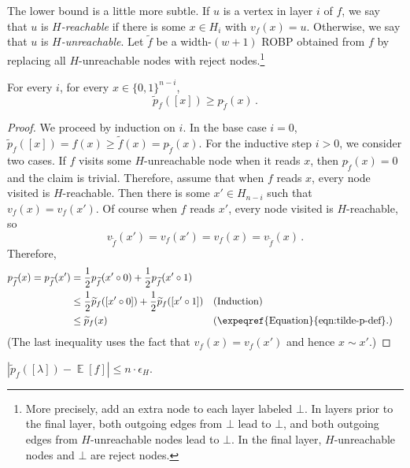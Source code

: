\documentclass{toc}
\DeclareMathOperator*{\ExpVal}{\mathbb{E}}
\begin{document}
The lower bound is a little more subtle. If $u$ is a vertex in layer $i$ of $f$, we say that $u$ is \emph{$H$-reachable} if there is some $x \in H_i$ with $v_f(x) = u$. Otherwise, we say that $u$ is \emph{$H$-unreachable}. Let $\widetilde{f}$ be a width-$(w + 1)$ ROBP obtained from $f$ by replacing all $H$-unreachable nodes with reject nodes.\footnote{More precisely, add an extra node to each layer labeled $\bot$. In layers prior to the final layer, both outgoing edges from $\bot$ lead to $\bot$, and both outgoing edges from $H$-unreachable nodes lead to $\bot$. In the final layer, $H$-unreachable nodes and $\bot$ are reject nodes.}

\begin{claim} \label{clm:const-width-lb}
For every $i$, for every $x \in \{0, 1\}^{n - i}$,
$$
\widetilde{p}_f([x]) \geq p_{\widetilde{f}}(x)\,.
$$
\end{claim}

\begin{proof}
We proceed by induction on $i$. In the base case $i = 0$, $\widetilde{p}_f([x]) = f(x) \geq \widetilde{f}(x) = p_{\widetilde{f}}(x)$. For the inductive step $i > 0$, we consider two cases. If $f$ visits some $H$-unreachable node when it reads $x$, then $p_{\widetilde{f}}(x) = 0$ and the claim is trivial. Therefore, assume that when $f$ reads $x$, every node visited is $H$-reachable. Then there is some $x' \in H_{n - i}$ such that $v_f(x) = v_f(x')$. Of course when $f$ reads $x'$, every node visited is $H$-reachable, so
$$
v_{\widetilde{f}}(x') = v_f(x') = v_f(x) = v_{\widetilde{f}}(x)\,.
$$
Therefore,
\begin{align*}
p_{\widetilde{f}}(x) = p_{\widetilde{f}}(x') &= \frac{1}{2} p_{\widetilde{f}}(x' \circ 0) + \frac{1}{2} p_{\widetilde{f}}(x' \circ 1) \\
&\leq \frac{1}{2} \widetilde{p}_f([x' \circ 0]) + \frac{1}{2} \widetilde{p}_f([x' \circ 1]) && \text{(Induction)} \\
&\leq \widetilde{p}_f(x) && (\text{\expeqref{Equation}{eqn:tilde-p-def}.})
\end{align*}
(The last inequality uses the fact that $v_f(x) = v_f(x')$ and hence $x \sim x'$.)
\end{proof}

\begin{corollary} \label{cor:tilde-p-error}
$|\widetilde{p}_f([\lambda]) - \ExpVal[f]| \leq n \cdot \epsilon_H$.
\end{corollary}
\end{document}
